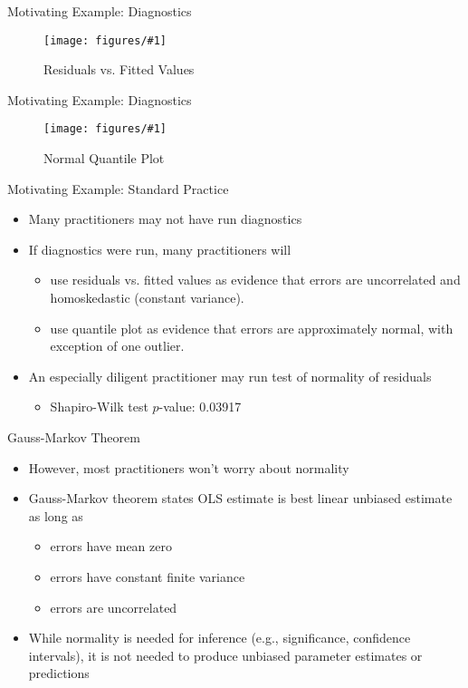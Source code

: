 \documentclass{beamer}
\newcommand{\img}[3]{\begin{figure}\centering\texttt{[image: figures/\#1]}\caption{#2}\end{figure}}
\begin{document}
\begin{frame}{Motivating Example: Diagnostics}
	\img{lm-error-dist-standard-fitted-values.pdf}{Residuals vs. Fitted Values}{4}
\end{frame}

\begin{frame}{Motivating Example: Diagnostics}
	\img{lm-error-dist-standard-qq.pdf}{Normal Quantile Plot}{4}
\end{frame}

\begin{frame}{Motivating Example: Standard Practice}
\begin{itemize}
	\item Many practitioners may not have run diagnostics
	\item If diagnostics were run, many practitioners will
		\begin{itemize}
			\item use residuals vs. fitted values as evidence that errors are uncorrelated and homoskedastic (constant variance).
			\item use quantile plot as evidence that errors are approximately normal, with exception of one outlier.
		\end{itemize}
	\item An especially diligent practitioner may run test of normality of residuals
		\begin{itemize}
			\item Shapiro-Wilk test $p$-value: 0.03917
		\end{itemize}
\end{itemize}
\end{frame}

\begin{frame}{Gauss-Markov Theorem}
\begin{itemize}
	\item However, most practitioners won't worry about normality
	\item Gauss-Markov theorem states OLS estimate is best linear unbiased estimate as long as
	\begin{itemize}
		\item errors have mean zero
		\item errors have constant finite variance
		\item errors are uncorrelated
	\end{itemize}
	\item While normality is needed for inference (e.g., significance, confidence intervals), it is not needed to produce unbiased parameter estimates or predictions
\end{itemize}
\end{frame}
\end{document}
